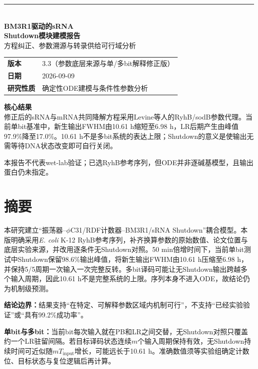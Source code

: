 \documentclass[UTF8,a4paper,11pt,fontset=windows]{ctexart}
\begin{document}
\begin{titlepage}
\thispagestyle{empty}
\vspace*{15mm}
{\color{Teal}\rule{25mm}{2.2pt}}\\[7mm]
{\fontsize{25}{31}\selectfont\bfseries\color{DeepInk}BM3R1驱动的sRNA\\[2mm]Shutdown模块建模报告}\\[7mm]
{\large\color{MidGray}方程纠正、参数溯源与转录供给可行域分析}\\[10mm]
\begin{tabular}{@{}ll@{}}
  \textbf{版本} & 3.3（参数底层来源与单/多bit解释修正版）\\
\textbf{日期} & 2026-09-09\\
\textbf{研究性质} & 确定性ODE建模与条件性参数分析
\end{tabular}
\vspace{11mm}
\begin{tcolorbox}[colback=DeepInk,colframe=DeepInk,arc=1.5mm,boxrule=0pt,left=5mm,right=5mm,top=4mm,bottom=4mm]
{\color{white}\bfseries 核心结果}\\[2mm]
  {\color{white}修正后的sRNA与mRNA共同降解方程采用Levine等人的RyhB/sodB参数代理。当前单bit基准中，新生输出FWHM由10.61 h缩短至6.98 h，LR后期产生由峰值97.9\%降至17.0\%。10.61 h不是多bit系统的表达上限；Shutdown的意义是使输出无需等待DNA状态改变即可自行关闭。}
\end{tcolorbox}
\vfill
  {\small\color{MidGray}本报告不代表wet-lab验证；已选RyhB参考序列，但ODE并非逐碱基模型，且输出蛋白仍未指定。}
\end{titlepage}

\section*{摘要}
本研究建立“振荡器--$\phi$C31/RDF计数器--BM3R1/sRNA Shutdown”耦合模型。本版明确采用\textit{E. coli} K-12 RyhB参考序列，补齐换算参数的原始数值、论文位置与底层实验来源，并改用逐条件无Shutdown对照。50 min倍增时间下，当前单bit测试中Shutdown保留98.6\%输出峰值，将新生输出FWHM由10.61 h压缩至6.98 h，并保持5/5周期一次输入一次完整反转。多bit译码可能让无Shutdown输出跨越多个输入周期，因此10.61 h不是完整系统的上限。序列本身不进入ODE，故结论仍为机制级预测。

\begin{boundarybox}
\textbf{结论边界：}结果支持“在特定、可解释参数区域内机制可行”，不支持“已经实验验证”或“具有99.2\%成功率”。
\end{boundarybox}

\begin{boundarybox}
\textbf{单bit与多bit：}当前bit每次输入就在PB和LR之间交替，无Shutdown对照只覆盖约一个LR驻留间隔。若目标译码状态连续$m$个输入周期保持有效，无Shutdown持续时间可近似随$mT_{\mathrm{input}}$增长，可能远长于10.61 h。准确数值须等实验组确定计数位、目标状态与复位逻辑后再计算。
\end{boundarybox}
\end{document}

